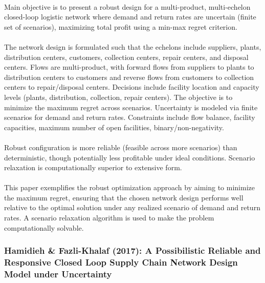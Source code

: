 \paragraph{} Main objective is to present a robust design for a multi-product, multi-echelon closed-loop logistic network where demand and return rates are uncertain (finite set of scenarios), maximizing total profit using a min-max regret criterion.

\paragraph{} The network design is formulated such that the echelons include suppliers, plants, distribution centers, customers, collection centers, repair centers, and disposal centers. Flows are multi-product, with forward flows from suppliers to plants to distribution centers to customers and reverse flows from customers to collection centers to repair/disposal centers. Decisions include facility location and capacity levels (plants, distribution, collection, repair centers). The objective is to minimize the maximum regret across scenarios. Uncertainty is modeled via finite scenarios for demand and return rates. Constraints include flow balance, facility capacities, maximum number of open facilities, binary/non-negativity.

\paragraph{} Robust configuration is more reliable (feasible across more scenarios) than deterministic, though potentially less profitable under ideal conditions. Scenario relaxation is computationally superior to extensive form.

\paragraph{} This paper exemplifies the robust optimization approach by aiming to minimize the maximum regret, ensuring that the chosen network design performs well relative to the optimal solution under any realized scenario of demand and return rates. A scenario relaxation algorithm is used to make the problem computationally solvable.

\subsubsection{Hamidieh \& Fazli-Khalaf (2017): A Possibilistic Reliable and Responsive Closed Loop Supply Chain Network Design Model under Uncertainty}

